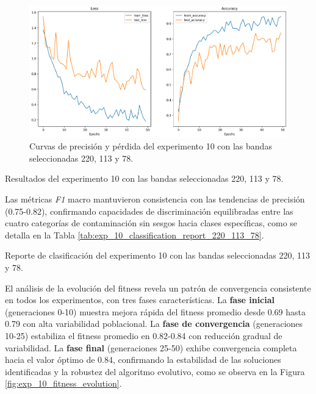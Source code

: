\begin{figure}[ht]
\centering
\includegraphics[width=\textwidth]{images/exp_10_cnn_results_220_113_78.png}
\caption{Curvas de precisión y pérdida del experimento 10 con las bandas seleccionadas 220, 113 y 78.}
\label{fig:exp_10_cnn_results_220_113_78}
\end{figure}

\begin{table}[ht]
\centering
\caption{Resultados del experimento 10 con las bandas seleccionadas 220, 113 y 78.}
\label{tab:exp_10_cnn_results_220_113_78}
\end{table}

Las métricas \emph{F1} macro mantuvieron consistencia con las tendencias de precisión (0.75-0.82), confirmando capacidades de discriminación equilibradas entre las cuatro categorías de contaminación sin sesgos hacia clases específicas, como se detalla en la Tabla \ref{tab:exp_10_classification_report_220_113_78}.

\begin{table}[ht]
\centering
\caption{Reporte de clasificación del experimento 10 con las bandas seleccionadas 220, 113 y 78.}
\label{tab:exp_10_classification_report_220_113_78}
\end{table}

El análisis de la evolución del fitness revela un patrón de convergencia consistente en todos los experimentos, con tres fases características. La \textbf{fase inicial} (generaciones 0-10) muestra mejora rápida del fitness promedio desde 0.69 hasta 0.79 con alta variabilidad poblacional. La \textbf{fase de convergencia} (generaciones 10-25) estabiliza el fitness promedio en 0.82-0.84 con reducción gradual de variabilidad. La \textbf{fase final} (generaciones 25-50) exhibe convergencia completa hacia el valor óptimo de 0.84, confirmando la estabilidad de las soluciones identificadas y la robustez del algoritmo evolutivo, como se observa en la Figura \ref{fig:exp_10_fitness_evolution}.

